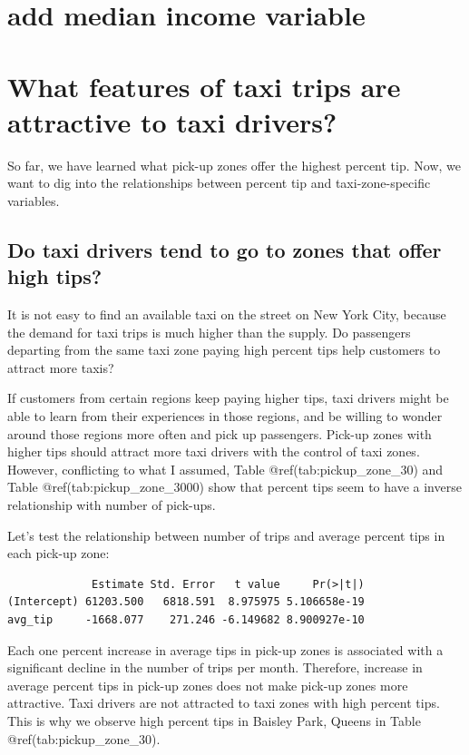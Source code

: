 \documentclass[12pt,twoside]{reedthesis}
\theoremstyle{definition}
\theoremstyle{definition}
\theoremstyle{definition}
\theoremstyle{remark}
\begin{document}
\section{add median income variable}\label{add-median-income-variable}

\section{What features of taxi trips are attractive to taxi
drivers?}\label{what-features-of-taxi-trips-are-attractive-to-taxi-drivers}

So far, we have learned what pick-up zones offer the highest percent
tip. Now, we want to dig into the relationships between percent tip and
taxi-zone-specific variables.

\subsection{Do taxi drivers tend to go to zones that offer high
tips?}\label{do-taxi-drivers-tend-to-go-to-zones-that-offer-high-tips}

It is not easy to find an available taxi on the street on New York City,
because the demand for taxi trips is much higher than the supply. Do
passengers departing from the same taxi zone paying high percent tips
help customers to attract more taxis?

If customers from certain regions keep paying higher tips, taxi drivers
might be able to learn from their experiences in those regions, and be
willing to wonder around those regions more often and pick up
passengers. Pick-up zones with higher tips should attract more taxi
drivers with the control of taxi zones. However, conflicting to what I
assumed, Table @ref(tab:pickup\_zone\_30) and Table
@ref(tab:pickup\_zone\_3000) show that percent tips seem to have a
inverse relationship with number of pick-ups.

Let's test the relationship between number of trips and average percent
tips in each pick-up zone:
\begin{verbatim}
             Estimate Std. Error   t value     Pr(>|t|)
(Intercept) 61203.500   6818.591  8.975975 5.106658e-19
avg_tip     -1668.077    271.246 -6.149682 8.900927e-10
\end{verbatim}
Each one percent increase in average tips in pick-up zones is associated
with a significant decline in the number of trips per month. Therefore,
increase in average percent tips in pick-up zones does not make pick-up
zones more attractive. Taxi drivers are not attracted to taxi zones with
high percent tips. This is why we observe high percent tips in Baisley
Park, Queens in Table @ref(tab:pickup\_zone\_30).
\end{document}
